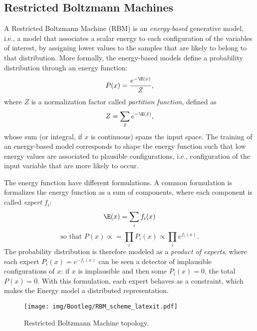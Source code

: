 \subsection{Restricted Boltzmann Machines}\label{sec:Bootleg:deep}
A Restricted Boltzmann Machine (RBM) is an \textit{energy-based} generative model, i.e., a model that associates a scalar energy to each configuration of the variables of interest, by assigning lower values to the samples that are likely to belong to that distribution. More formally, the energy-based models define a probability distribution through an energy function:
\begin{equation}
P(x)=\frac{e^{-\E(x)}}{Z},
\label{eq:probEnergy}
\end{equation}
where $Z$ is a normalization factor called \textit{partition function}, defined as 
\begin{equation}
Z=\sum_{\tilde{x}} e^{-\E(\tilde{x})},
\end{equation}
whose sum (or integral, if $x$ is continuous) spans the input space. The training of an energy-based model corresponds to shape the energy function such that low energy values are associated to plausible configurations, i.e., configuration of the input variable that are more likely to occur.

The energy function have different formulations. A common formulation is formalizes the energy function as a sum of components, where each component is called \textit{expert} $f_i$:
\begin{equation}
\E(x)=\sum_i f_i(x)
\end{equation}
\begin{equation}
\text{so that }P(x)\propto=\prod_i P_i(x) \propto \prod_i e^{f_i(x)}.
\label{eq:HLFs:experts}
\end{equation}
The probability distribution is therefore modeled as a \textit{product of experts}, where each expert $P_i(x)=e^{-f_i(x)}$ can be seen a detector of implausible configurations of $x$: if $x$ is implausible and then some $P_i(x)=0$, the total $P(x)=0$. With this formulation, each expert behaves as a constraint, which makes the Energy model a distributed representation.

\begin{figure}[tbp]
	\centering
	\texttt{[image: img/Bootleg/RBM\_scheme\_latexit.pdf]}
	\caption{Restricted Boltzmann Machine topology.}
	\label{fig:Bootleg:RBMScheme}
	\vspace{-1em}
\end{figure}

